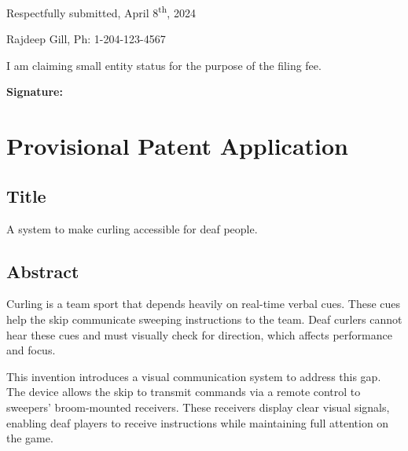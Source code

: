 \documentclass{article}
\begin{document}
\vspace{1cm}

\noindent
Respectfully submitted, April 8\textsuperscript{th}, 2024

\vspace{3mm}

\noindent
Rajdeep Gill, Ph: 1-204-123-4567

\vspace{5mm}

\noindent
I am claiming small entity status for the purpose of the filing fee.

\vspace{1cm}

\noindent
\textbf{Signature:} \underline{\hspace{5cm}}


\newpage


\section{Provisional Patent Application}

\subsection{Title}
A system to make curling accessible for deaf people.

\subsection{Abstract}
Curling is a team sport that depends heavily on real-time verbal cues. These cues help the skip communicate sweeping instructions to the team. Deaf curlers cannot hear these cues and must visually check for direction, which affects performance and focus. 

This invention introduces a visual communication system to address this gap. The device allows the skip to transmit commands via a remote control to sweepers' broom-mounted receivers. These receivers display clear visual signals, enabling deaf players to receive instructions while maintaining full attention on the game.
\end{document}
